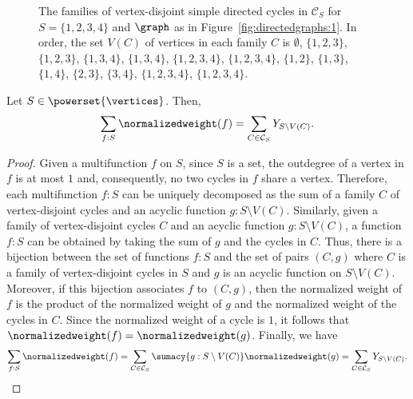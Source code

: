\begin{figure}[htbp]
    \caption{The families of vertex-disjoint simple directed cycles in \(\mathcal{C}_S\) for \(S = \{1, 2, 3, 4\}\) and \(\graph\) as in Figure~\ref{fig:directedgraphs:1}.
    In order, the set \(V(C)\) of vertices in each family \(C\) is
    \(\emptyset\),
    \(\{1, 2, 3\}\), \(\{1, 2, 3\}\), \(\{1, 3, 4\}\), \(\{1, 3, 4\}\),
    \(\{1, 2, 3, 4\}\), \(\{1, 2, 3, 4\}\),
    \(\{1, 2\}\), \(\{1, 3\}\), \(\{1, 4\}\), \(\{2, 3\}\), \(\{3, 4\}\),
    \(\{1, 2, 3, 4\}\), \(\{1, 2, 3, 4\}\).}
    \label{fig:familyofcycles}
\end{figure}

\begin{lemm} \label{lemma:set:decomposition:acyclic}
    Let \(S \in \powerset{\vertices}\).
    Then,
    \begin{equation*}
        \sum_{f : S} \normalizedweight(f)
        = \sum_{C \in \mathcal{C}_S} Y_{S \setminus V(C)}.
    \end{equation*}
\end{lemm}

\begin{proof}
    Given a multifunction \(f\) on \(S\),
    since \(S\) is a set,
    the outdegree of a vertex in \(f\) is at most \(1\) and,
    consequently, no two cycles in \(f\) share a vertex.
    Therefore,
    each multifunction \(f \colon S\) can be uniquely decomposed as the sum of a family \(C\) of vertex-disjoint cycles and an acyclic function \(g \colon S \setminus V(C)\).
    Similarly, given a family of vertex-disjoint cycles \(C\) and an acyclic function \(g \colon S \setminus V(C)\),
    a function \(f \colon S\) can be obtained by taking the sum of \(g\) and the cycles in \(C\).
    Thus, there is a bijection between the set of functions \(f \colon S\) and
    the set of pairs \((C, g)\) where \(C\) is a family of vertex-disjoint cycles in \(S\) and \(g\) is an acyclic function on \(S \setminus V(C)\).
    Moreover,
    if this bijection associates \(f\) to \((C, g)\),
    then the normalized weight of \(f\) is the product of the normalized weight of \(g\) and the normalized weight of the cycles in \(C\).
    Since the normalized weight of a cycle is \(1\), it follows that \(\normalizedweight(f) = \normalizedweight(g)\).
    Finally, we have
    \begin{equation*}
        \sum_{f : S} \normalizedweight(f)
        = \sum_{C \in \mathcal{C}_S} \sumacy{g : S \setminus V(C)} \normalizedweight(g)
        = \sum_{C \in \mathcal{C}_S} Y_{S \setminus V(C)}. \qedhere
    \end{equation*}
\end{proof}

